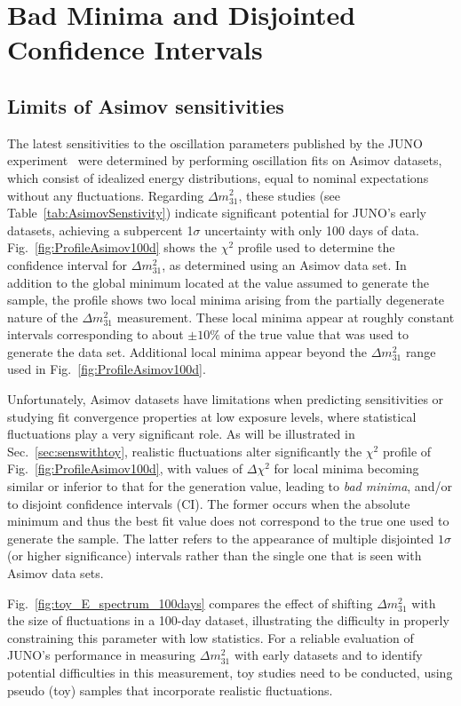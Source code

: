 \section{Bad Minima and Disjointed Confidence Intervals}\label{sec:2_bad_minima}
\subsection{Limits of Asimov sensitivities}
\label{AsimLimit}

The latest sensitivities to the oscillation parameters published by the JUNO experiment~\cite{JUNO:2024jaw, JUNO:2022osc} were determined by performing oscillation
fits on Asimov datasets, which consist of idealized energy distributions, equal to nominal expectations without any fluctuations.
Regarding $\Delta m^2_{31}$, these studies (see Table~\ref{tab:AsimovSenstivity}) indicate significant potential for JUNO's early datasets,
achieving a subpercent 1$\sigma$ uncertainty with only 100 days of data. Fig.~\ref{fig:ProfileAsimov100d} shows the $\chi^2$ profile used to determine the confidence 
interval for $\Delta m^2_{31}$, as determined using an Asimov data set. In addition to the global minimum located at the value assumed to generate the sample, the profile shows two local 
minima arising from the partially degenerate nature of the $\Delta m^2_{31}$ measurement. These local minima appear at roughly constant intervals corresponding to about $\pm10\%$ of the true value that was used to generate the data set. Additional local minima appear beyond the $\Delta m^2_{31}$ range used in Fig.~\ref{fig:ProfileAsimov100d}. 

Unfortunately, Asimov datasets have limitations when predicting sensitivities or 
studying fit convergence properties at low exposure levels, where statistical fluctuations play a very significant role.  As will be illustrated in Sec.~\ref{sec:senswithtoy}, realistic fluctuations alter 
significantly the $\chi^2$ profile of Fig.~\ref{fig:ProfileAsimov100d}, with values of $\Delta \chi^2$ for local minima becoming similar or inferior to that for the generation value, leading to {\it bad minima}, and/or to disjoint confidence intervals (CI). The former occurs when the absolute minimum and thus the best fit value does not correspond to the true one used to generate the sample. The latter refers to the appearance of multiple disjointed $1\sigma$ (or higher significance) intervals rather than the single one that is seen with Asimov data sets. 

Fig.~\ref{fig:toy_E_spectrum_100days} compares the effect of shifting $\Delta m^2_{31}$ with the size of fluctuations in a 100-day dataset, illustrating the difficulty in properly constraining this parameter with low statistics. 
For a reliable evaluation of JUNO's performance in measuring $\Delta m^2_{31}$ with early datasets and to identify potential
difficulties in this measurement, toy studies need to be conducted, using pseudo (toy) samples that incorporate realistic fluctuations.


